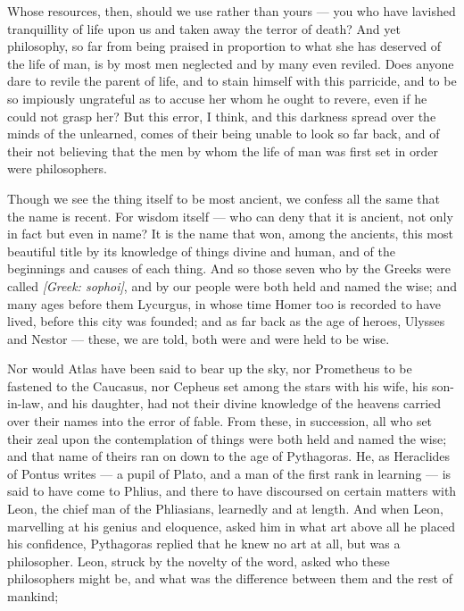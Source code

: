  Whose resources, then, should we use rather than yours — you who have lavished tranquillity of life upon us and taken away the terror of death? And yet philosophy, so far from being praised in proportion to what she has deserved of the life of man, is by most men neglected and by many even reviled. Does anyone dare to revile the parent of life, and to stain himself with this parricide, and to be so impiously ungrateful as to accuse her whom he ought to revere, even if he could not grasp her? But this error, I think, and this darkness spread over the minds of the unlearned, comes of their being unable to look so far back, and of their not believing that the men by whom the life of man was first set in order were philosophers.

 Though we see the thing itself to be most ancient, we confess all the same that the name is recent. For wisdom itself — who can deny that it is ancient, not only in fact but even in name? It is the name that won, among the ancients, this most beautiful title by its knowledge of things divine and human, and of the beginnings and causes of each thing. And so those seven who by the Greeks were called \textit{[Greek: sophoi]}, and by our people were both held and named the wise; and many ages before them Lycurgus, in whose time Homer too is recorded to have lived, before this city was founded; and as far back as the age of heroes, Ulysses and Nestor — these, we are told, both were and were held to be wise.

 Nor would Atlas have been said to bear up the sky, nor Prometheus to be fastened to the Caucasus, nor Cepheus set among the stars with his wife, his son-in-law, and his daughter, had not their divine knowledge of the heavens carried over their names into the error of fable. From these, in succession, all who set their zeal upon the contemplation of things were both held and named the wise; and that name of theirs ran on down to the age of Pythagoras. He, as Heraclides of Pontus writes — a pupil of Plato, and a man of the first rank in learning — is said to have come to Phlius, and there to have discoursed on certain matters with Leon, the chief man of the Phliasians, learnedly and at length. And when Leon, marvelling at his genius and eloquence, asked him in what art above all he placed his confidence, Pythagoras replied that he knew no art at all, but was a philosopher. Leon, struck by the novelty of the word, asked who these philosophers might be, and what was the difference between them and the rest of mankind;

